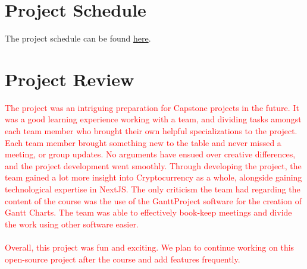 \documentclass[12pt,fleqn]{article}
\begin{document}
\section{Project Schedule}
\noindent The project schedule can be found \href{https://gitlab.cas.mcmaster.ca/webapp/webapp_l02_grp15/-/tree/main/ProjectSchedule}{here}.

\section{Project Review}
\textcolor{red}{The project was an intriguing preparation for Capstone projects in the future. It was a good learning experience working with a team, and dividing tasks amongst each team member who brought their own helpful specializations to the project. Each team member brought something new to the table and never missed a meeting, or group updates. No arguments have ensued over creative differences, and the project development went smoothly. Through developing the project, the team gained a lot more insight into Cryptocurrency as a whole, alongside gaining technological expertise in NextJS. The only criticism the team had regarding the content of the course was the use of the GanttProject software for the creation of Gantt Charts. The team was able to effectively book-keep meetings and divide the work using other software easier. \\ \\ Overall, this project was fun and exciting. We plan to continue working on this open-source project after the course and add features frequently.}
\end{document}
